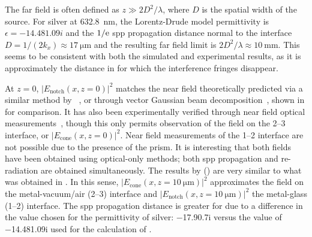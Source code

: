 The far field is often defined as $z\gg 2 D^2/\lambda$, where $D$ is the
spatial width of the source.  For silver at \SI{632.8}{\nano\meter}, the
Lorentz-Drude model permittivity is $\epsilon = \num{-14.48+1.09i}$ and the
$1/{\mathrm{e}}$ \gls{spp} propagation distance normal to the interface $D = 1/(2 k_x)
  \approx \SI{17}{\micro\meter}$ and the resulting far field limit is $2
  D^2/\lambda \approx \SI{10}{\milli\meter}$.  This seems to be consistent with
both the simulated and experimental results, as it is approximately the
distance in  for which the interference fringes
disappear.

At $z=0$, $|E_\text{notch}(x,z=0)|^2$ matches the near field theoretically
predicted via a similar method by ~\cite{chuang1986lateral}, or
through vector Gaussian beam decomposition~\cite{baida1999theoretical}, shown
in  for comparison.  It has also been experimentally
verified through near field optical measurements~\cite{dawson2001surface},
though this only permits observation of the field on the 2--3 interface, or
$|E_\text{cone}(x,z=0)|^2$.  Near field measurements of the 1--2 interface are
not possible due to the presence of the prism.  It is interesting that both
fields have been obtained using optical-only methods; both \gls{spp} propagation and
re-radiation are obtained simultaneously.  The results by 
() are very similar to what was obtained in
.  In this sense,
$|E_\text{cone}(x,z=\SI{10}{\micro\meter})|^2$ approximates the field on the
metal-vacuum/air (2--3) interface and
$|E_\text{notch}(x,z=\SI{10}{\micro\meter})|^2$ the metal-glass (1--2)
interface.  The \gls{spp} propagation distance is greater for  due to a
difference in the value chosen for the permittivity of silver:
\num{-17.9+0.7i} versus the value of \num{-14.48+1.09i} used for the
calculation of .


